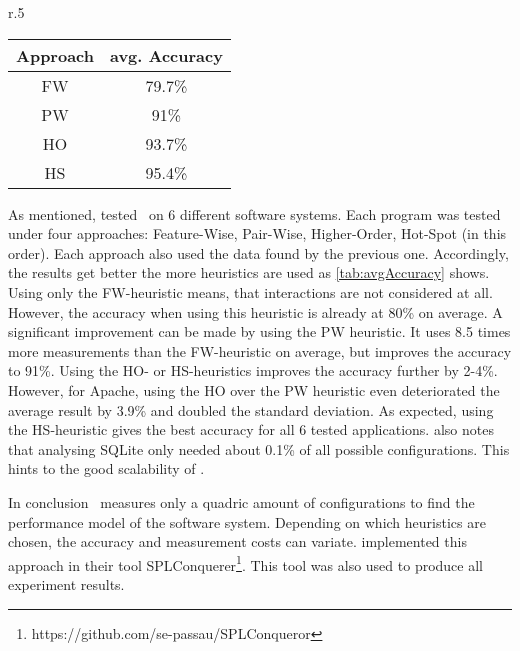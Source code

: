 \begin{wrapfigure}{r}{.5\textwidth}
	\centering
	\label{tab:avgAccuracy}
	\begin{tabular}{c|c}
		Approach&avg. Accuracy\\\midrule[1pt]
		FW&79.7\%\\\hline
		PW&91\%\\\hline
		HO&93.7\%\\\hline
		HS&95.4\%\\\hline
	\end{tabular}
	\vspace{\baselineskip}
\end{wrapfigure}\noindent
As mentioned, \citet{AutomatedFeatureDetectionSiegmund2012} tested \AFID~on 6 different software systems. Each program was tested under four approaches: Feature-Wise, Pair-Wise, Higher-Order, Hot-Spot (in this order). Each approach also used the data found by the previous one. Accordingly, the results get better the more heuristics are used as \cref{tab:avgAccuracy} shows. Using only the FW-heuristic means, that interactions are not considered at all. However, the accuracy when using this heuristic is already at 80\% on average. A significant improvement can be made by using the PW heuristic. It uses  8.5 times more measurements than the FW-heuristic on average, but improves the accuracy to 91\%. Using the HO- or HS-heuristics improves the accuracy further by 2-4\%. However, for Apache, using the HO over the PW heuristic even deteriorated the average result by 3.9\% and doubled the standard deviation. As expected, using the HS-heuristic gives the best accuracy for all 6 tested applications. \citet{AutomatedFeatureDetectionSiegmund2012} also notes that analysing SQLite only needed about 0.1\% of all possible configurations. This hints to the good scalability of \AFID.

In conclusion \AFID~measures only a quadric amount of configurations to find the performance model of the software system. Depending on which heuristics are chosen, the accuracy and measurement costs can variate. \citet{AutomatedFeatureDetectionSiegmund2012} implemented this approach in their tool SPLConquerer\footnote{https://github.com/se-passau/SPLConqueror}. This tool was also used to produce all experiment results.